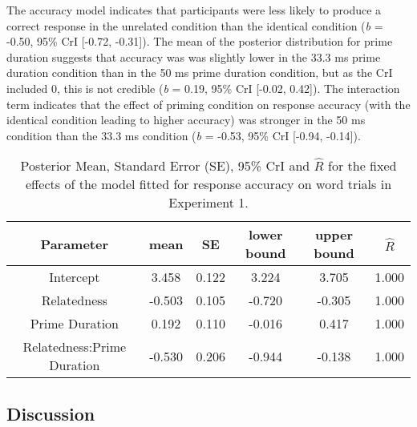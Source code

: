 \documentclass[
  english,
  man,floatsintext]{apa6}
\begin{document}
The accuracy model indicates that participants were less likely to produce a correct response in the unrelated condition than the identical condition (\emph{b} = -0.50, 95\% CrI {[}-0.72, -0.31{]}). The mean of the posterior distribution for prime duration suggests that accuracy was was slightly lower in the 33.3 ms prime duration condition than in the 50 ms prime duration condition, but as the CrI included 0, this is not credible (\emph{b} = 0.19, 95\% CrI {[}-0.02, 0.42{]}). The interaction term indicates that the effect of priming condition on response accuracy (with the identical condition leading to higher accuracy) was stronger in the 50 ms condition than the 33.3 ms condition (\emph{b} = -0.53, 95\% CrI {[}-0.94, -0.14{]}).



\begin{table}[H]

\begin{center}
\begin{threeparttable}

\caption{\label{tab:exp1-acc-blmm-table}Posterior Mean, Standard Error (SE), 95\% CrI and \(\hat{R}\) for the fixed effects of the model fitted for response accuracy on word trials in Experiment 1.}

\small{

\begin{tabular}{cccccc}
\toprule
Parameter & \multicolumn{1}{c}{mean} & \multicolumn{1}{c}{SE} & \multicolumn{1}{c}{lower bound} & \multicolumn{1}{c}{upper bound} & \multicolumn{1}{c}{$\hat{R}$}\\
\midrule
Intercept & 3.458 & 0.122 & 3.224 & 3.705 & 1.000\\
Relatedness & -0.503 & 0.105 & -0.720 & -0.305 & 1.000\\
Prime Duration & 0.192 & 0.110 & -0.016 & 0.417 & 1.000\\
Relatedness:Prime Duration & -0.530 & 0.206 & -0.944 & -0.138 & 1.000\\
\bottomrule
\end{tabular}

}

\end{threeparttable}
\end{center}

\end{table}

\hypertarget{discussion}{%
\subsection{Discussion}\label{discussion}}
\end{document}
